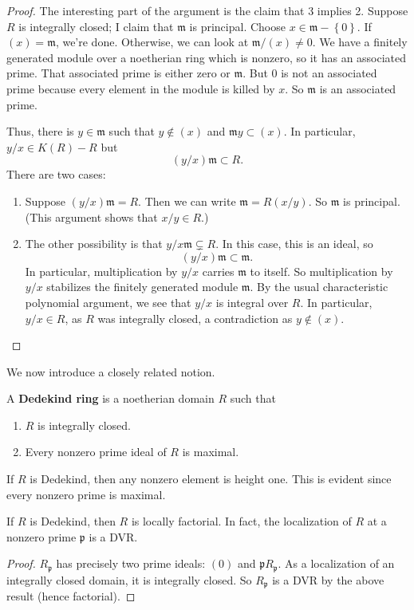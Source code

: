 \begin{example}
\begin{proof}
The interesting part of the argument is the claim that 3
implies 2. Suppose $R$ is integrally closed; I claim that $\mathfrak{m}$ is
principal. Choose $x \in \mathfrak{m} - \left\{0\right\}$. If $(x) =
\mathfrak{m}$, we're done. Otherwise, we can look at $\mathfrak{m}/(x) \neq
0$.  We have a finitely generated module over a noetherian ring which is
nonzero, so it has an associated prime. That associated prime is either zero or
$\mathfrak{m}$. But $0$ is not an associated prime because every element in the
module is killed by $x$. So $\mathfrak{m}$ is an associated prime.

Thus, there is $y \in \mathfrak{m}$ such that $y \notin (x)$ and $\mathfrak{m}y
\subset (x)$. In particular, $y/x \in K(R) - R$ but
\[ (y/x) \mathfrak{m} \subset R.  \]
There are two cases:
\begin{enumerate}
\item Suppose $(y/x) \mathfrak{m}  = R$. Then we can write $\mathfrak{m} =
R(x/y)$. So $\mathfrak{m}$ is principal. (This argument shows that $x/y \in R$.)	
\item The other possibility is that $y/x \mathfrak{m} \subsetneq R$. In this
case, this is an ideal, so 
\[ (y/x) \mathfrak{m} \subset \mathfrak{m}.  \]
In particular, multiplication by $y/x$ carries $\mathfrak{m}$ to itself.  So
multiplication by $y/x$ stabilizes the finitely generated module
$\mathfrak{m}$. By the usual characteristic polynomial argument, we see that
$y/x$ is integral over $R$. In particular, $y/x \in R$, as $R$
was integrally closed, a contradiction as $y \notin (x)$. 
\end{enumerate}
\end{proof} 

We now introduce a closely related notion.  
\begin{definition} 
A \textbf{Dedekind ring} is a noetherian domain $R$ such that 
\begin{enumerate}
\item $R$ is integrally closed.
\item Every nonzero prime ideal of $R$ is maximal. 
\end{enumerate}
\end{definition} 
\end{example} 


\begin{remark} 
If $R$ is Dedekind, then any nonzero element is height one. This is evident
since every nonzero prime is maximal. 

If $R$ is Dedekind, then $R$ is locally factorial. In fact, the localization of
$R$ at a nonzero prime $\mathfrak{p}$ is a DVR.
\begin{proof} 
$R_{\mathfrak{p}}$ has precisely two prime ideals: $(0)$ and
$\mathfrak{p}R_{\mathfrak{p}}$. As a localization of an integrally closed
domain, it is integrally closed. So $R_{\mathfrak{p}}$ is a DVR by the above
result (hence
factorial).
\end{proof} 
\end{remark} 


